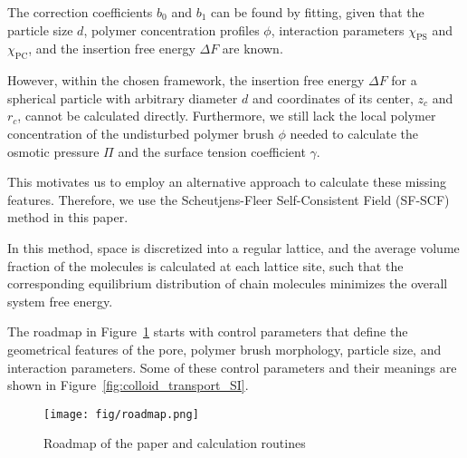 \documentclass[10pt, a4paper]{article}
\begin{document}
\begin{multicols}{2}
The correction coefficients $b_0$ and $b_1$ can be found by fitting, given that the particle size $d$, polymer concentration profiles $\phi$, interaction parameters $\chi_{\text{PS}}$ and $\chi_{\text{PC}}$, and the insertion free energy $\Delta F$ are known.

However, within the chosen framework, the insertion free energy $\Delta F$ for a spherical particle with arbitrary diameter $d$ and coordinates of its center, $z_c$ and $r_c$, cannot be calculated directly.
Furthermore, we still lack the local polymer concentration of the undisturbed polymer brush $\phi$ needed to calculate the osmotic pressure $\Pi$ and the surface tension coefficient $\gamma$.


This motivates us to employ an alternative approach to calculate these missing features.
Therefore, we use the Scheutjens-Fleer Self-Consistent Field (SF-SCF) method in this paper.

In this method, space is discretized into a regular lattice, and the average volume fraction of the molecules is calculated at each lattice site, such that the corresponding equilibrium distribution of chain molecules minimizes the overall system free energy.


The roadmap in Figure~\ref{fig:paper_roadmap} starts with control parameters that define the geometrical features of the pore, polymer brush morphology, particle size, and interaction parameters.
Some of these control parameters and their meanings are shown in Figure~\ref{fig:colloid_transport_SI}.

\begin{figure}[H]
    \centering
    \texttt{[image: fig/roadmap.png]}
    \caption{Roadmap of the paper and calculation routines}
    \label{fig:paper_roadmap}
\end{figure}

\end{multicols}

\end{document}
